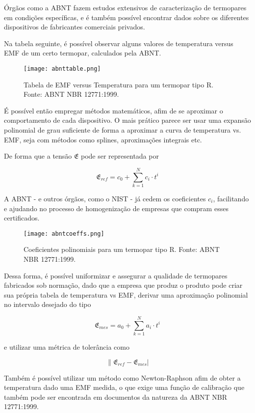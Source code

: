 \documentclass[a4paper,12pt]{report}
\begin{document}
	Órgãos como a ABNT fazem estudos extensivos de caracterização de termopares em condições específicas, e é também possível encontrar dados sobre os diferentes dispositivos de fabricantes comerciais privados.
	
	Na tabela seguinte, é possível observar alguns valores de temperatura versus EMF de um certo termopar, calculados pela ABNT.
	
	\begin{figure}[H]
		\centering
		\texttt{[image: abnttable.png]}\\
		\caption{Tabela de EMF versus Temperatura para um termopar tipo R. Fonte: ABNT NBR 12771:1999.}
	\end{figure}

	É possível então empregar métodos matemáticos, afim de se aproximar o comportamento de cada dispositivo. O mais prático parece ser usar uma expansão polinomial de grau suficiente de forma a aproximar a curva de temperatura vs. EMF, seja com métodos como splines, aproximações integrais etc.

	De forma que a tensão $\mathfrak{E}$ pode ser representada por
	
	\[\mathfrak{E}_{ref} = c_{0} + \sum_{k = 1}^{N}c_{i} \cdot t^{i}\]
	
	A ABNT - e outros órgãos, como o NIST - já cedem os coeficientes $c_{i}$, facilitando e ajudando no processo de homogenização de empresas que compram esses certificados.
	
		\begin{figure}[H]
		\centering
		\texttt{[image: abntcoeffs.png]}\\
		\caption{Coeficientes polinomiais para um termopar tipo R. Fonte: ABNT NBR 12771:1999.}
	\end{figure}

	Dessa forma, é possível uniformizar e assegurar a qualidade de termopares fabricados sob normação, dado que a empresa que produz o produto pode criar sua própria tabela de temperatura vs EMF, derivar uma aproximação polinomial no intervalo desejado do tipo
	
	\[\mathfrak{E}_{mes} = a_{0} + \sum_{k = 1}^{N}a_{i} \cdot t^{i}\]
	
	e utilizar uma métrica de tolerância como
	
	\[\|\mathfrak{E}_{ref} - \mathfrak{E}_{mes}|\] 
	
	Também é possível utilizar um método como Newton-Raphson afim de obter a temperatura dado uma EMF medida, o que exige uma função de calibração que também pode ser encontrada em documentos da natureza da ABNT NBR 12771:1999.
	
\end{document}
